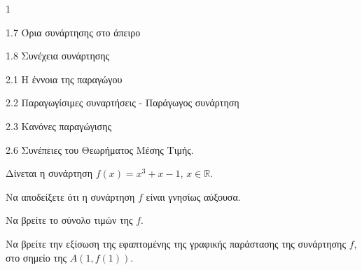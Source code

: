 \begin{ylh}{1}
    \item 1.7 Όρια συνάρτησης στο άπειρο
    \item 1.8 Συνέχεια συνάρτησης
    \item 2.1 Η έννοια της παραγώγου
    \item 2.2 Παραγωγίσιμες συναρτήσεις - Παράγωγος συνάρτηση
    \item 2.3 Κανόνες παραγώγισης
    \item 2.6 Συνέπειες του Θεωρήματος Μέσης Τιμής.
\end{ylh}
Δίνεται η συνάρτηση $f(x)=x^3+x-1$, $x \in \mathbb{R}$.
\begin{alist}
\item Να αποδείξετε ότι η συνάρτηση $f$ είναι γνησίως αύξουσα. 
\item Να βρείτε το σύνολο τιμών της $f$. 
\item Να βρείτε την εξίσωση της εφαπτομένης της γραφικής παράστασης της συνάρτησης $f$, στο σημείο της $A(1,f(1))$. 
\end{alist}